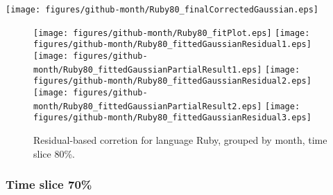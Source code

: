 \begin{center}
{\texttt{[image: figures/github-month/Ruby80\_finalCorrectedGaussian.eps]}}
\end{center}

\FloatBarrier

\begin{figure}[t]
\centering
{}
{\texttt{[image: figures/github-month/Ruby80\_fitPlot.eps]}}
{\texttt{[image: figures/github-month/Ruby80\_fittedGaussianResidual1.eps]}}
{\texttt{[image: figures/github-month/Ruby80\_fittedGaussianPartialResult1.eps]}}
{\texttt{[image: figures/github-month/Ruby80\_fittedGaussianResidual2.eps]}}
{\texttt{[image: figures/github-month/Ruby80\_fittedGaussianPartialResult2.eps]}}
{\texttt{[image: figures/github-month/Ruby80\_fittedGaussianResidual3.eps]}}
\caption{Residual-based corretion for language Ruby, grouped by month, time slice 80\%.}
\end{figure}


\FloatBarrier


\subsubsection{Time slice 70\%}

